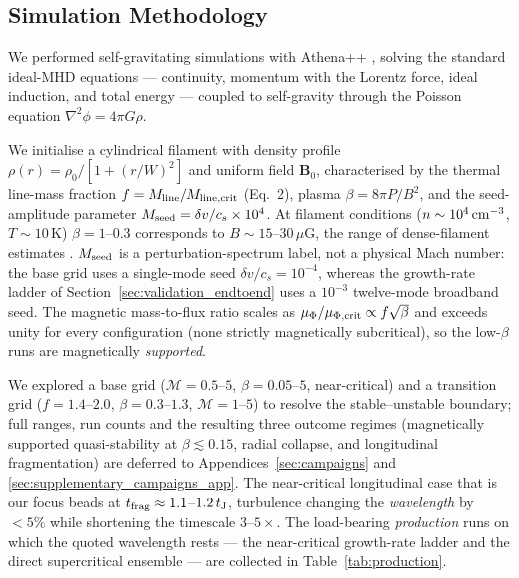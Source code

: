 \documentclass[usenatbib,twoside,twocolumn]{mnras}
\begin{document}
\subsection{Simulation Methodology}

We performed self-gravitating simulations with Athena++ \citep{Stone2020}, solving the standard ideal-MHD equations --- continuity, momentum with the Lorentz force, ideal induction, and total energy --- coupled to self-gravity through the Poisson equation $\nabla^2\phi=4\pi G\rho$.

We initialise a cylindrical filament with density profile $\rho(r)=\rho_0/[1+(r/W)^2]$ and uniform field $\mathbf{B}_0$, characterised by the thermal line-mass fraction $f=M_{\rm line}/M_{\rm line,crit}$ (Eq.~2), plasma $\beta=8\pi P/B^2$, and the seed-amplitude parameter $M_{\rm seed}=\delta v/c_s\times10^{4}$. At filament conditions ($n\sim10^4\,{\rm cm^{-3}}$, $T\sim10$\,K) $\beta=1$--$0.3$ corresponds to $B\sim15$--$30\,\mu$G, the range of dense-filament estimates \citep{Crutcher2012}. $M_{\rm seed}$ is a perturbation-spectrum label, not a physical Mach number: the base grid uses a single-mode seed $\delta v/c_s=10^{-4}$, whereas the growth-rate ladder of Section~\ref{sec:validation_endtoend} uses a $10^{-3}$ twelve-mode broadband seed. The magnetic mass-to-flux ratio scales as $\mu_\Phi/\mu_{\Phi,\rm crit}\propto f\sqrt{\beta}$ and exceeds unity for every configuration (none strictly magnetically subcritical), so the low-$\beta$ runs are magnetically \emph{supported}.

We explored a base grid ($\mathcal{M}=0.5$--$5$, $\beta=0.05$--$5$, near-critical) and a transition grid ($f=1.4$--$2.0$, $\beta=0.3$--$1.3$, $\mathcal{M}=1$--$5$) to resolve the stable--unstable boundary; full ranges, run counts and the resulting three outcome regimes (magnetically supported quasi-stability at $\beta\lesssim0.15$, radial collapse, and longitudinal fragmentation) are deferred to Appendices~\ref{sec:campaigns} and \ref{sec:supplementary_campaigns_app}. The near-critical longitudinal case that is our focus beads at $t_{\rm frag}\approx1.1$--$1.2\,t_{\rm J}$, turbulence changing the \emph{wavelength} by $<5\%$ while shortening the timescale $3$--$5\times$. The load-bearing \emph{production} runs on which the quoted wavelength rests --- the near-critical growth-rate ladder and the direct supercritical ensemble --- are collected in Table~\ref{tab:production}.
\end{document}
